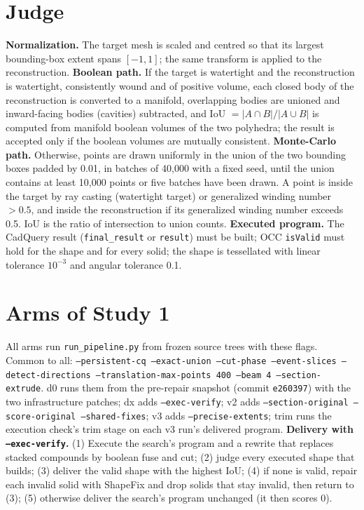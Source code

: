 \section{Judge}
\label{app:judge}
\textbf{Normalization.} The target mesh is scaled and centred so that its largest bounding-box extent spans $[-1,1]$; the same transform is applied to the reconstruction. \textbf{Boolean path.} If the target is watertight and the reconstruction is watertight, consistently wound and of positive volume, each closed body of the reconstruction is converted to a manifold, overlapping bodies are unioned and inward-facing bodies (cavities) subtracted, and IoU $=|A\cap B|/|A\cup B|$ is computed from manifold boolean volumes of the two polyhedra; the result is accepted only if the boolean volumes are mutually consistent. \textbf{Monte-Carlo path.} Otherwise, points are drawn uniformly in the union of the two bounding boxes padded by 0.01, in batches of 40{,}000 with a fixed seed, until the union contains at least 10{,}000 points or five batches have been drawn. A point is inside the target by ray casting (watertight target) or generalized winding number $>0.5$, and inside the reconstruction if its generalized winding number exceeds 0.5. IoU is the ratio of intersection to union counts. \textbf{Executed program.} The CadQuery result (\texttt{final\_result} or \texttt{result}) must be built; OCC \texttt{isValid} must hold for the shape and for every solid; the shape is tessellated with linear tolerance $10^{-3}$ and angular tolerance 0.1.

\section{Arms of Study 1}
\label{app:arms}
All arms run \texttt{run\_pipeline.py} from frozen source trees with these flags. Common to all: \texttt{--persistent-cq --exact-union --cut-phase --event-slices --detect-directions --translation-max-points 400 --beam 4 --section-extrude}. d0 runs them from the pre-repair snapshot (commit \texttt{e260397}) with the two infrastructure patches; dx adds \texttt{--exec-verify}; v2 adds \texttt{--section-original --score-original --shared-fixes}; v3 adds \texttt{--precise-extents}; trim runs the execution check's trim stage on each v3 run's delivered program. \textbf{Delivery with \texttt{--exec-verify}.} (1) Execute the search's program and a rewrite that replaces stacked compounds by boolean fuse and cut; (2) judge every executed shape that builds; (3) deliver the valid shape with the highest IoU; (4) if none is valid, repair each invalid solid with ShapeFix and drop solids that stay invalid, then return to (3); (5) otherwise deliver the search's program unchanged (it then scores 0).

